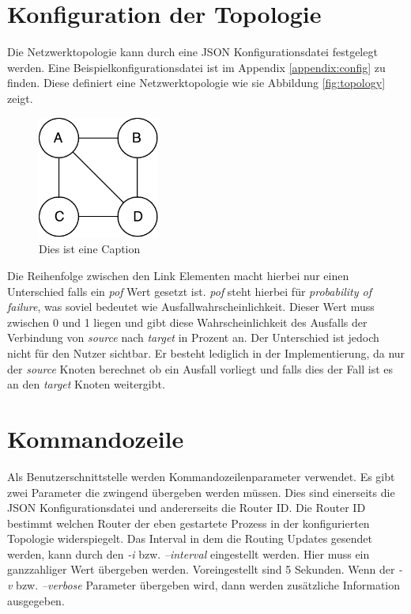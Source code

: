 \documentclass[a4paper,ngerman]{article}
\begin{document}
\section{Konfiguration der Topologie}
\label{sec:configuration}

Die Netzwerktopologie kann durch eine JSON Konfigurationsdatei festgelegt werden. Eine Beispielkonfigurationsdatei ist im Appendix \vref{appendix:config} zu finden. Diese definiert eine Netzwerktopologie wie sie Abbildung \vref{fig:topology} zeigt.

\begin{figure}[H]
    \centering
    \includegraphics[width=4cm,keepaspectratio]{topology2}
    \caption{Dies ist eine Caption}
    \label{fig:topology}
\end{figure}

Die Reihenfolge zwischen den Link Elementen macht hierbei nur einen Unterschied falls ein \textit{pof} Wert gesetzt ist. \textit{pof} steht hierbei für \textit{probability of failure}, was soviel bedeutet wie Ausfallwahrscheinlichkeit. Dieser Wert muss zwischen 0 und 1 liegen und gibt diese Wahrscheinlichkeit des Ausfalls der Verbindung von \textit{source} nach \textit{target} in Prozent an. Der Unterschied ist jedoch nicht für den Nutzer sichtbar. Er besteht lediglich in der Implementierung, da nur der \textit{source} Knoten berechnet ob ein Ausfall vorliegt und falls dies der Fall ist es an den \textit{target} Knoten weitergibt.

\section{Kommandozeile}

Als Benutzerschnittstelle werden Kommandozeilenparameter verwendet. Es gibt zwei Parameter die zwingend übergeben werden müssen. Dies sind einerseits die JSON Konfigurationsdatei und andererseits die Router ID. Die Router ID bestimmt welchen Router der eben gestartete Prozess in der konfigurierten Topologie widerspiegelt. Das Interval in dem die Routing Updates gesendet werden, kann durch den \textit{-i} bzw. \textit{--interval} eingestellt werden. Hier muss ein ganzzahliger Wert übergeben werden. Voreingestellt sind 5 Sekunden. Wenn der \textit{-v} bzw. \textit{--verbose} Parameter übergeben wird, dann werden zusätzliche Information ausgegeben.
\end{document}
